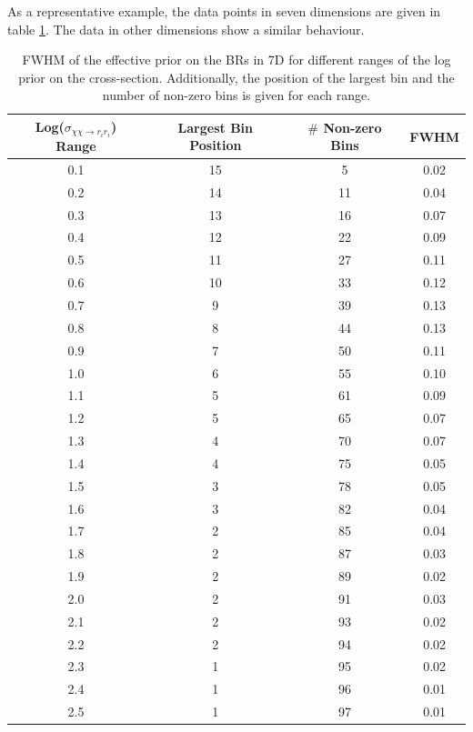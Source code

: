 \documentclass{article}
\begin{document}
As a representative example, the data points in seven dimensions are given in table \ref{FWHM_7D}. The data in other dimensions show a similar behaviour.
\begin{table}[htp]
\centering
\fontsize{9}{9}\selectfont
\begin{tabular}{c|c|c|c|}
\hline
\hline
 Log($\sigma_{\chi \chi \rightarrow r_i r_i}$) Range & Largest Bin Position & $\#$ Non-zero Bins & FWHM \\
\hline
0.1 & 15 & 5 & 0.02\\
0.2 & 14 & 11 & 0.04\\
0.3 & 13 & 16 & 0.07\\
0.4 & 12 & 22 & 0.09\\
0.5 & 11 & 27 & 0.11\\
0.6 & 10 & 33 & 0.12\\
0.7 & 9 & 39 & 0.13\\
0.8 & 8 & 44 & 0.13\\
0.9 & 7 & 50 & 0.11\\
1.0 & 6 & 55 & 0.10\\
1.1 & 5 & 61 & 0.09\\
1.2 & 5 & 65 & 0.07\\
1.3 & 4 & 70 & 0.07\\
1.4 & 4 & 75 & 0.05\\
1.5 & 3 & 78 & 0.05\\
1.6 & 3 & 82 & 0.04\\
1.7 & 2 & 85 & 0.04\\
1.8 & 2 & 87 & 0.03\\
1.9 & 2 & 89 & 0.02\\
2.0 & 2 & 91 & 0.03\\
2.1 & 2 & 93 & 0.02\\
2.2 & 2 & 94 & 0.02\\
2.3 & 1 & 95 & 0.02\\
2.4 & 1 & 96 & 0.01\\
2.5 & 1 & 97 & 0.01\\
\hline
\end{tabular}
\caption{\fontsize{9}{9}\selectfont FWHM of the effective prior on the BRs in 7D for different ranges of the log prior on the cross-section. Additionally, the position of the largest bin and the number of non-zero bins is given for each range.} 
\label{FWHM_7D}
\end{table}
\end{document}
